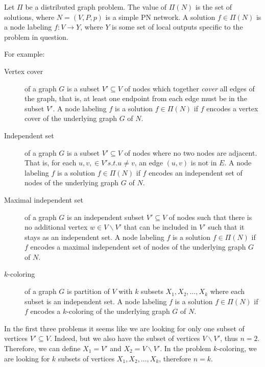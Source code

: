 Let $\Pi$ be a distributed graph problem.
The value of $\Pi(N)$ is the set of solutions, where $N=(V, P, p)$ is a simple PN network.
A solution $f \in \Pi(N)$ is a node labeling $f\colon V \rightarrow Y$, where $Y$ is some set of local outputs specific to the problem in question.

For example:
\begin{description}
  \item[Vertex cover] of a graph $G$ is a subset $V' \subseteq V$ of nodes which together \emph{cover} all edges of the graph, that is, at least one endpoint from each edge must be in the subset $V'$.
  A node labeling $f$ is a solution $f \in \Pi(N)$ if $f$ encodes a vertex cover of the underlying graph $G$ of $N$.
  \item[Independent set] of a graph $G$ is a subset $V' \subseteq V$ of nodes where no two nodes are adjacent. That is, for each $u, v, \in V' s.t. u \neq v$, an edge $(u, v)$ is not in $E$.
  A node labeling $f$ is a solution $f \in \Pi(N)$ if $f$ encodes an independent set of nodes of the underlying graph $G$ of $N$.
  \item[Maximal independent set] of a graph $G$ is an independent subset $V' \subseteq V$ of nodes such that there is no additional vertex $w \in V \backslash V'$ that can be included in $V'$ such that it stays as an independent set.
  A node labeling $f$ is a solution $f \in \Pi(N)$ if $f$ encodes a maximal independent set of nodes of the underlying graph $G$ of $N$.
  \item[$k$-coloring] of a graph $G$ is partition of $V$ with $k$ subsets $X_1, X_2, \dotsc, X_k$ where each subset is an independent set.
  A node labeling $f$ is a solution $f \in \Pi(N)$ if $f$ encodes a $k$-coloring of the underlying graph $G$ of $N$.
\end{description}

In the first three problems it seems like we are looking for only one subset of vertices $V' \subseteq V$.
Indeed, but we also have the subset of vertices $V \backslash V'$, thus $n=2$.
Therefore, we can define $X_1 = V'$ and $X_2 = V \backslash V'$.
In the problem $k$-coloring, we are looking for $k$ subsets of vertices $X_1, X_2, \dotsc, X_k$, therefore $n=k$.

